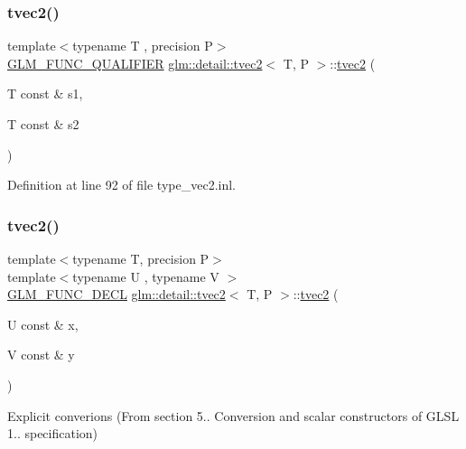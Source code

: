 \subsubsection{\texorpdfstring{tvec2()}{tvec2()}\hspace{0.1cm}{\footnotesize\ttfamily [6/15]}}
{\footnotesize\ttfamily template$<$typename T , precision P$>$ \\
\hyperlink{setup_8hpp_a33fdea6f91c5f834105f7415e2a64407}{G\+L\+M\+\_\+\+F\+U\+N\+C\+\_\+\+Q\+U\+A\+L\+I\+F\+I\+ER} \hyperlink{structglm_1_1detail_1_1tvec2}{glm\+::detail\+::tvec2}$<$ T, P $>$\+::\hyperlink{structglm_1_1detail_1_1tvec2}{tvec2} (\begin{DoxyParamCaption}\item[{T const \&}]{s1,  }\item[{T const \&}]{s2 }\end{DoxyParamCaption})}



Definition at line 92 of file type\+\_\+vec2.\+inl.

\mbox{\label{structglm_1_1detail_1_1tvec2_a7521b4e5e4260e7e53f936b01b18e3c7}} 
\subsubsection{\texorpdfstring{tvec2()}{tvec2()}\hspace{0.1cm}{\footnotesize\ttfamily [7/15]}}
{\footnotesize\ttfamily template$<$typename T, precision P$>$ \\
template$<$typename U , typename V $>$ \\
\hyperlink{setup_8hpp_ab2d052de21a70539923e9bcbf6e83a51}{G\+L\+M\+\_\+\+F\+U\+N\+C\+\_\+\+D\+E\+CL} \hyperlink{structglm_1_1detail_1_1tvec2}{glm\+::detail\+::tvec2}$<$ T, P $>$\+::\hyperlink{structglm_1_1detail_1_1tvec2}{tvec2} (\begin{DoxyParamCaption}\item[{U const \&}]{x,  }\item[{V const \&}]{y }\end{DoxyParamCaption})}



Explicit converions (From section 5.. Conversion and scalar constructors of G\+L\+SL 1.. specification) 

\mbox{\label{structglm_1_1detail_1_1tvec2_aac611127f03f3948bacb14b063fa3aca}} 
